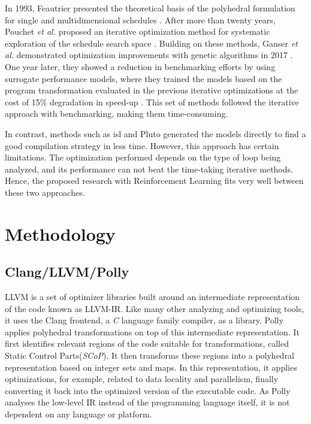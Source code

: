 \documentclass[logo,msc]{infthesis}           %
\begin{document}
In 1993, Feautrier presented the theoretical basis of the polyhedral formulation for single and multidimensional schedules \cite{single}\cite{multi}. After more than twenty years, Pouchet \textit{et al.} proposed an iterative optimization method for systematic exploration of the schedule search space \cite{it_Single}\cite{it_multi}. Building on these methods, Ganser \textit{et al.} demonstrated optimization improvements with genetic algorithms in 2017 \cite{10.1145/3109482}. One year later, they showed a reduction in benchmarking efforts by using surrogate performance models, where they trained the models based on the program transformation evaluated in the previous iterative optimizations at the cost of 15\% degradation in speed-up \cite{10.1145/3291773}. This set of methods followed the iterative approach with benchmarking, making them time-consuming.

In contrast, methods such as isl\cite{isl} and Pluto\cite{Bondhugula07pluto:a} generated the models directly to find a good compilation strategy in less time. However, this approach has certain limitations. The optimization performed depends on the type of loop being analyzed, and its performance can not beat the time-taking iterative methods. Hence, the proposed research with Reinforcement Learning fits very well between these two approaches.

\chapter{Methodology}

\section{Clang/LLVM/Polly}

LLVM is a set of optimizer libraries built around an intermediate representation of the code known as LLVM-IR. Like many other analyzing and optimizing tools, it uses the Clang frontend, a \textit{C} language family compiler, as a library.
Polly applies polyhedral transformations on top of this intermediate representation\cite{grosser2011polly}. It first identifies relevant regions of the code suitable for transformations, called Static Control Parts(\textit{SCoP})\cite{grosser2011polly}. It then transforms these regions into a polyhedral representation based on integer sets and maps. In this representation, it applies optimizations, for example, related to data locality and parallelism, finally converting it back into the optimized version of the executable code. As Polly analyses the low-level IR instead of the programming language itself, it is not dependent on any language or platform.
\end{document}
